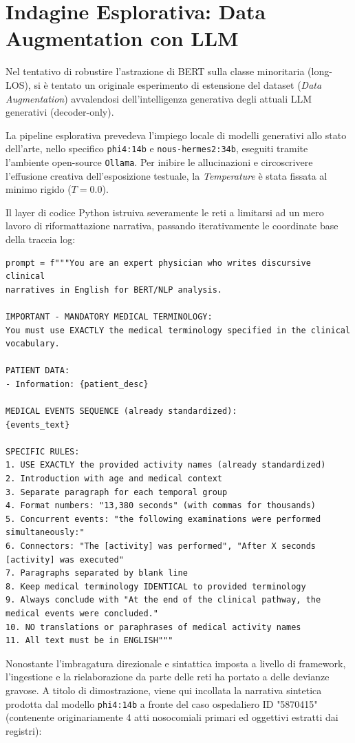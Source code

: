 \section{Indagine Esplorativa: Data Augmentation con LLM}
Nel tentativo di robustire l'astrazione di BERT sulla classe minoritaria (long-LOS), si è tentato un originale esperimento di estensione del dataset (\textit{Data Augmentation}) avvalendosi dell'intelligenza generativa degli attuali LLM generativi (decoder-only).

La pipeline esplorativa prevedeva l'impiego locale di modelli generativi allo stato dell'arte, nello specifico \texttt{phi4:14b} e \texttt{nous-hermes2:34b}, eseguiti tramite l'ambiente open-source \texttt{Ollama}. Per inibire le allucinazioni e circoscrivere l'effusione creativa dell'esposizione testuale, la \textit{Temperature} è stata fissata al minimo rigido ($T=0.0$). 

Il layer di codice Python istruiva severamente le reti a limitarsi ad un mero lavoro di riformattazione narrativa, passando iterativamente le coordinate base della traccia log:

\begin{verbatim}
prompt = f"""You are an expert physician who writes discursive clinical
narratives in English for BERT/NLP analysis.

IMPORTANT - MANDATORY MEDICAL TERMINOLOGY:
You must use EXACTLY the medical terminology specified in the clinical vocabulary.

PATIENT DATA:
- Information: {patient_desc}

MEDICAL EVENTS SEQUENCE (already standardized):
{events_text}

SPECIFIC RULES:
1. USE EXACTLY the provided activity names (already standardized)
2. Introduction with age and medical context
3. Separate paragraph for each temporal group
4. Format numbers: "13,380 seconds" (with commas for thousands)
5. Concurrent events: "the following examinations were performed simultaneously:"
6. Connectors: "The [activity] was performed", "After X seconds [activity] was executed"
7. Paragraphs separated by blank line
8. Keep medical terminology IDENTICAL to provided terminology
9. Always conclude with "At the end of the clinical pathway, the medical events were concluded."
10. NO translations or paraphrases of medical activity names
11. All text must be in ENGLISH"""
\end{verbatim}

Nonostante l'imbragatura direzionale e sintattica imposta a livello di framework, l'ingestione e la rielaborazione da parte delle reti ha portato a delle devianze gravose. A titolo di dimostrazione, viene qui incollata la narrativa sintetica prodotta dal modello \texttt{phi4:14b} a fronte del caso ospedaliero ID "5870415" (contenente originariamente 4 atti nosocomiali primari ed oggettivi estratti dai registri):

